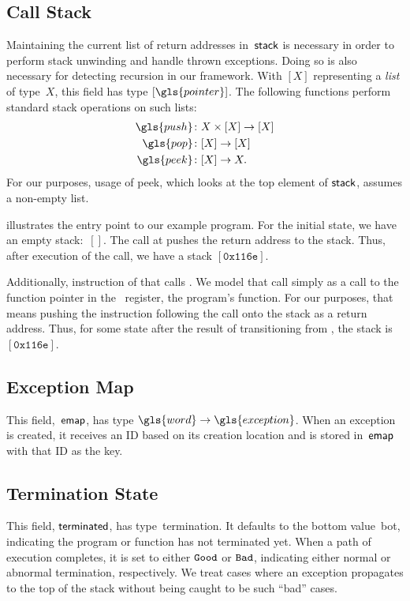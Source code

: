 \subsection{Call Stack}
Maintaining the current list of return addresses in~$\mathsf{stack}$ is necessary in order to perform stack unwinding and handle thrown exceptions.
Doing so is also necessary for detecting recursion in our framework.
With $[X]$ representing a \emph{list} of type~$X$, this field has type $[\gls{pointer}]$.
The following functions perform standard stack operations on such lists:
 \begin{align*}
  \gls{push} &\colon X\times[X]\to[X] \\
  \gls{pop} &\colon [X]\to[X] \\
  \gls{peek} &\colon [X]\to X.
\end{align*}
For our purposes, usage of \gls{peek}, which looks at the top element of $\mathsf{stack}$, assumes a non-empty list.
\begin{example}
   illustrates the entry point to our example program.
  For the initial state, we have an empty stack:~$[]$.
  The call at  pushes the return address to the stack.
  Thus, after execution of the call, we have a stack $[\mathtt{0x116e}]$.

  Additionally, instruction  of that  calls .
  We model that call simply as a call to the function pointer in the \rdi\ register, the program's  function.
  For our purposes, that means pushing the instruction following the call onto the stack as a return address.
  Thus, for some state after the result of transitioning from , the stack is $[\mathtt{0x116e}]$.
\end{example}

\subsection{Exception Map}
This field,~$\operatorname{\mathsf{emap}}$, has type $\gls{word}\to\gls{exception}$.
When an exception is created, it receives an ID based on its creation location and is stored in~$\operatorname{\mathsf{emap}}$ with that ID as the key.

\subsection{Termination State}
This field, $\mathsf{terminated}$, has type~\gls{termination}.
It defaults to the bottom value~\gls{bot}, indicating the program or function has not terminated yet.
When a path of execution completes, it is set to either $\mathtt{Good}$ or $\mathtt{Bad}$, indicating either normal or abnormal termination, respectively.
We treat cases where an exception propagates to the top of the stack without being caught to be such ``bad'' cases.

